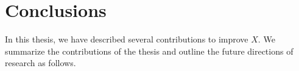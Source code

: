 \chapter{Conclusions}\label{ch:conclusions}

In this thesis, we have described several contributions to improve $X$. We summarize the contributions of the thesis and outline the future directions of research as follows.
